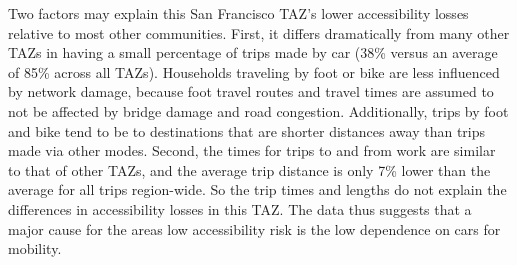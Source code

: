 Two factors may explain this San Francisco TAZ's lower accessibility losses relative to most other communities.
First, it differs dramatically from many other TAZs in having a small percentage of trips made by car (38\% versus an average of 85\% across all TAZs). Households traveling by foot or bike are less influenced by network damage, because foot travel routes and travel times are assumed to not be affected by bridge damage and road congestion. Additionally, trips by foot and bike tend to be to destinations that are shorter distances away than trips made via other modes. 
 Second, the times for trips to and from work are similar to that of other TAZs, and the average trip distance is only 7\% lower than the average for all trips region-wide. So the trip times and lengths do not explain the differences in accessibility losses in this TAZ.
The data thus suggests that a major cause for the areas low accessibility risk is the low dependence on cars for mobility. 